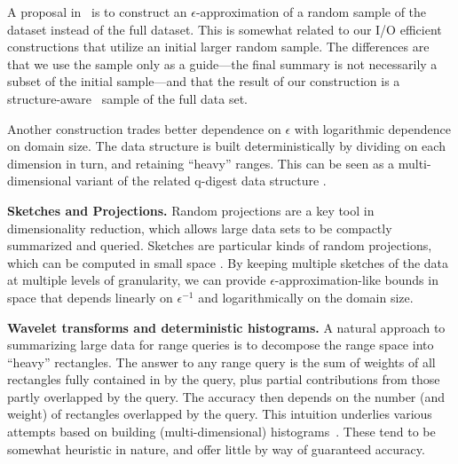 \documentclass[11pt]{article}
\begin{document}
A proposal in~\cite{BCDHS:KDD2003}
is to construct an $\epsilon$-approximation of a random sample of the dataset
instead of the full dataset.  This is somewhat related to our I/O efficient
 constructions that utilize an initial larger random sample. 
The differences are that we use the sample only as a guide---the final
summary is not necessarily a subset of the initial sample---and that
the result of our construction is a structure-aware \varopt\ sample of
the full data set. 

Another construction \cite{HSST:ISAAC04}
trades better dependence on $\epsilon$ with logarithmic dependence on
domain size.
The data structure is built deterministically by dividing on each
dimension in turn, and retaining ``heavy'' ranges. 
This can be seen as a multi-dimensional variant of the related
q-digest data structure \cite{ShrivastavaBAS:sensys04}.





\smallskip
\noindent
{\bf Sketches and Projections.}
Random projections are a key tool in dimensionality reduction, which
allows large data sets to be compactly summarized and queried. 
Sketches are particular kinds of random projections, which can be
computed in small space \cite{ccf:icalp2002}.
By keeping multiple sketches of the data at multiple levels of
granularity, we can provide $\epsilon$-approximation-like bounds in
space that depends linearly on $\epsilon^{-1}$ and logarithmically on
the domain size.   

\smallskip
\noindent
{\bf Wavelet transforms and deterministic histograms.}
A natural approach to summarizing large data for range queries is to
decompose the range space into ``heavy'' rectangles. 
The answer to any range query is the sum of weights of all rectangles
fully contained in by the query, plus partial contributions from those
partly overlapped by the query. 
The accuracy then depends on the number (and weight) of rectangles
overlapped by the query. 
This intuition underlies various attempts based on building 
 (multi-dimensional)
histograms~\cite{GKTD:sigmod2000,PoosalaIoannidis:VLDB97,LKC:sigmod1999}.
These tend to be somewhat heuristic in nature, and offer little by way
of guaranteed accuracy.
\end{document}
